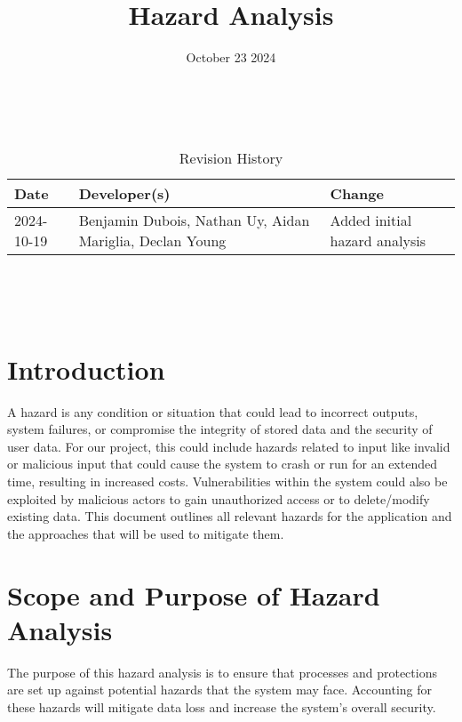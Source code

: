 \documentclass{article}
\title{Hazard Analysis\\\progname}
\author{\authname}
\date{October 23 2024}
\begin{document}
\maketitle
\thispagestyle{empty}

~\newpage


\begin{table}[hp]
\caption{Revision History} \label{TblRevisionHistory}
\begin{tabularx}{\textwidth}{llX}
\toprule
\textbf{Date} & \textbf{Developer(s)} & \textbf{Change}\\
\midrule
2024-10-19 & Benjamin Dubois, Nathan Uy, Aidan Mariglia, Declan Young & Added initial hazard analysis\\
\bottomrule
\end{tabularx}
\end{table}

~\newpage

\tableofcontents

\listoftables

~\newpage


\section{Introduction}

A hazard is any condition or situation that could lead to incorrect outputs, system failures, or compromise the integrity of stored data and the security of user data. For our project, this could include hazards related to input like invalid or malicious input that could cause the system to crash or run for an extended time, resulting in increased costs. Vulnerabilities within the system could also be exploited by malicious actors to gain unauthorized access or to delete/modify existing data. This document outlines all relevant hazards for the application and the approaches that will be used to mitigate them.

\section{Scope and Purpose of Hazard Analysis}

The purpose of this hazard analysis is to ensure that processes and protections are set up against potential hazards that the system may face. Accounting for these hazards will mitigate data loss and increase the system's overall security. 
\end{document}
